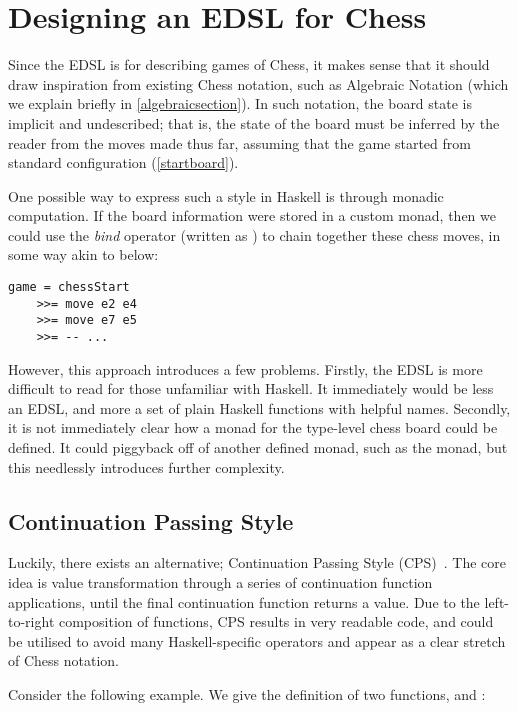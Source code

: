 \section{Designing an EDSL for Chess}

Since the EDSL is for describing games of Chess, it makes sense that it should draw inspiration from existing Chess notation, such as Algebraic Notation (which we explain briefly in \cref{algebraicsection}). In such notation, the board state is implicit and undescribed; that is, the state of the board must be inferred by the reader from the moves made thus far, assuming that the game started from standard configuration (\cref{startboard}).

One possible way to express such a style in Haskell is through monadic computation. If the board information were stored in a custom monad, then we could use the \emph{bind} operator (written as \inline{(>>=)}) to chain together these chess moves, in some way akin to below:

\begin{lstlisting}
game = chessStart
    >>= move e2 e4
    >>= move e7 e5
    >>= -- ...
\end{lstlisting}

However, this approach introduces a few problems. Firstly, the EDSL is more difficult to read for those unfamiliar with Haskell. It immediately would be less an EDSL, and more a set of plain Haskell functions with helpful names. Secondly, it is not immediately clear how a monad for the type-level chess board could be defined. It could piggyback off of another defined monad, such as the  monad, but this needlessly introduces further complexity.

\subsection{Continuation Passing Style} \label{cpsshortexample}

Luckily, there exists an alternative; Continuation Passing Style (CPS)~\cite{cps}. The core idea is value transformation through a series of continuation function applications, until the final continuation function returns a value. Due to the left-to-right composition of functions, CPS results in very readable code, and could be utilised to avoid many Haskell-specific operators and appear as a clear stretch of Chess notation.

Consider the following example. We give the definition of two functions,  and :


